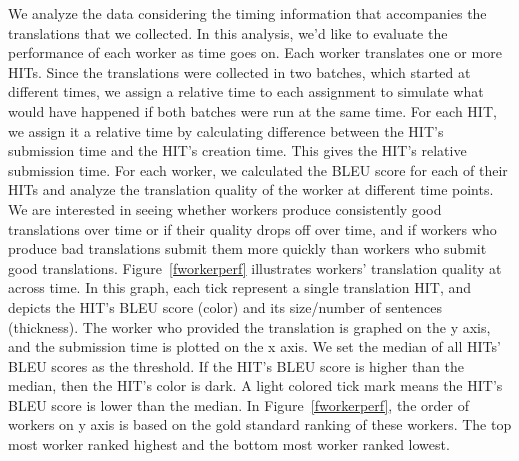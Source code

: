 \documentclass[11pt]{article}
\begin{document}
We analyze the data considering the timing information that accompanies the translations that we collected. In this analysis, we'd like to evaluate the performance of each worker as time goes on. Each worker translates one or more HITs. Since the translations were collected in two batches, which started at different times, we assign a relative time to each assignment to simulate what would have happened if both batches were run at the same time.  For each HIT, we assign it a relative time by calculating difference between the HIT's submission time and the HIT's creation time. This gives the HIT's relative submission time.  For each worker, we calculated the BLEU score for each of their HITs and analyze the translation quality of the worker at different time points. We are interested in seeing whether workers produce consistently good translations over time or if their quality drops off over time, and if workers who produce bad translations submit them more quickly than workers who submit good translations.  Figure~\ref{fworkerperf} illustrates workers' translation quality at across time. In this graph, each tick represent a single translation HIT, and depicts the HIT's BLEU score (color) and its size/number of sentences (thickness).  The worker who provided the translation is graphed on the y axis, and the submission time is plotted on the x axis. We set the median of all HITs' BLEU scores as the threshold. If the HIT's BLEU score is higher than the median, then the HIT's color is dark.  A light colored tick mark means the HIT's BLEU score is lower than the median. In Figure~\ref{fworkerperf}, the order of workers on y axis is based on the gold standard ranking of these workers. The top most worker ranked highest and the bottom most worker ranked lowest. 
\end{document}
